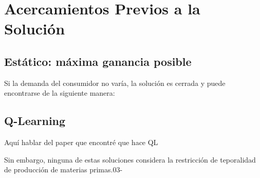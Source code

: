 \chapter{Acercamientos Previos a la Soluci\'on}

\section{Est\'atico: m\'axima ganancia posible}

Si la demanda del consumidor no var\'ia, la soluci\'on es cerrada y puede encontrarse de la siguiente manera:

\section{Q-Learning}

Aqu\'i hablar del paper que encontr\'e que hace QL

Sin embargo, ninguna de estas soluciones considera la restricción de teporalidad de producción de materias primas.03-